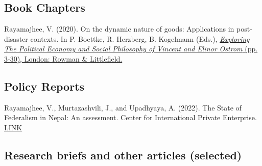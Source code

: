 \documentclass[12pt,letterpaper]{report}
\begin{document}
    \subsection*{Book Chapters}

	\begin{etaremune} [leftmargin=15 pt, start=1]

	\item  Rayamajhee, V. (2020). On the dynamic nature of goods: Applications in post-disaster contexts. In  P.  Boettke, R. Herzberg, B. Kogelmann  (Eds.), \href{https://www.researchgate.net/publication/345889991_On_the_Dynamic_Nature_of_Goods_Applications_in_Post-disaster_Contexts}
    {\textit{Exploring The Political Economy and Social Philosophy of Vincent and Elinor Ostrom} (pp. 3-30), London: Rowman \& Littlefield.
            }


	\end{etaremune}

    \subsection*{Policy Reports}

    \begin{etaremune}
    \item Rayamajhee, V., Murtazashvili, J., and Upadhyaya, A. (2022). The State of Federalism in Nepal: An assessment. Center for International Private Enterprise.
    \href{https://www.cipe.org/wp-content/uploads/2022/11/THE-STATE-OF-FEDERALISM-IN-NEPAL_2022.pdf}
    {LINK \faExternalLink}
	\end{etaremune}


 \subsection*{Research briefs and other articles (selected)}
\end{document}
